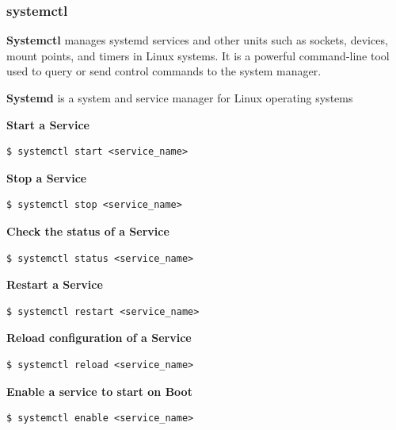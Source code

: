 \documentclass{article}
\newenvironment{codetemplate}[1][]{%
  \mybasecolorbox[#1]
  \itshape
}{%
  \endmybasecolorbox
}
\begin{document}
\subsubsection{systemctl}
\textbf{Systemctl} manages systemd services and other units such as sockets, devices, mount points, and timers in Linux systems. It is a powerful command-line tool used to query or send control commands to the system manager.

\textbf{Systemd} is a system and service manager for Linux operating systems

\textbf{Start a Service}
\begin{codetemplate}{}
\begin{verbatim}
$ systemctl start <service_name>
\end{verbatim}
\end{codetemplate}

\textbf{Stop a Service}
\begin{codetemplate}{}
\begin{verbatim}
$ systemctl stop <service_name>
\end{verbatim}
\end{codetemplate}

\textbf{Check the status of a Service}
\begin{codetemplate}{}
\begin{verbatim}
$ systemctl status <service_name>
\end{verbatim}
\end{codetemplate}

\textbf{Restart a Service}
\begin{codetemplate}{}
\begin{verbatim}
$ systemctl restart <service_name>
\end{verbatim}
\end{codetemplate}

\textbf{Reload configuration of a Service}
\begin{codetemplate}{}
\begin{verbatim}
$ systemctl reload <service_name>
\end{verbatim}
\end{codetemplate}

\textbf{Enable a service to start on Boot}
\begin{codetemplate}{}
\begin{verbatim}
$ systemctl enable <service_name>
\end{verbatim}
\end{codetemplate}
\end{document}
